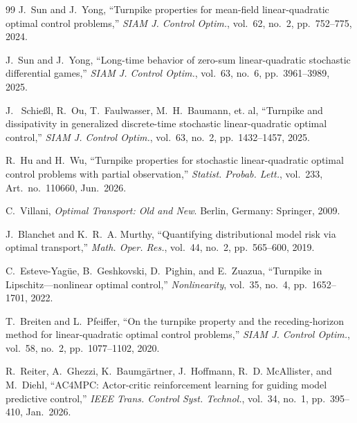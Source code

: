\documentclass[10pt,journal,twoside]{IEEEtran}
\theoremstyle{definition}
\theoremstyle{remark}
\begin{document}
\begin{thebibliography}{99}
J.~Sun and J.~Yong,
\newblock ``Turnpike properties for mean-field linear-quadratic optimal
control problems,''
\newblock \emph{SIAM J. Control Optim.}, vol.~62, no.~2,
pp.~752--775, 2024.

J.~Sun and J.~Yong,
\newblock ``Long-time behavior of zero-sum linear-quadratic stochastic
differential games,''
\newblock \emph{SIAM J. Control Optim.}, vol.~63, no.~6,
pp.~3961--3989, 2025.

J. ~Schie{\ss}l, R.~Ou, T.~Faulwasser, M.~H.~Baumann, et. al, 
\newblock ``Turnpike and dissipativity in generalized discrete-time stochastic linear-quadratic optimal control,''
\newblock \emph{SIAM J. Control Optim.}, vol.~63, no.~2, pp.~1432--1457, 2025.

R.~Hu and H.~Wu,
\newblock ``Turnpike properties for stochastic linear-quadratic optimal
control problems with partial observation,''
\newblock \emph{Statist. Probab. Lett.}, vol.~233, Art.~no.~110660,
Jun.~2026.

C.~Villani,
\newblock \emph{Optimal Transport: Old and New}.
\newblock Berlin, Germany: Springer, 2009.

J.~Blanchet and K.~R.~A. Murthy,
\newblock ``Quantifying distributional model risk via optimal
transport,''
\newblock \emph{Math. Oper. Res.}, vol.~44, no.~2, pp.~565--600, 2019.



C.~Esteve-Yag\"{u}e, B.~Geshkovski, D.~Pighin, and E.~Zuazua,
\newblock ``Turnpike in Lipschitz---nonlinear optimal control,''
\newblock \emph{Nonlinearity}, vol.~35, no.~4,
pp.~1652--1701, 2022.



T.~Breiten and L.~Pfeiffer,
\newblock ``On the turnpike property and the receding-horizon method for
linear-quadratic optimal control problems,''
\newblock \emph{SIAM J. Control Optim.}, vol.~58, no.~2,
pp.~1077--1102, 2020.

R.~Reiter, A.~Ghezzi, K.~Baumg{\"a}rtner, J.~Hoffmann,
R.~D. McAllister, and M.~Diehl,
\newblock ``AC4MPC: Actor-critic reinforcement learning for guiding model
predictive control,''
\newblock \emph{IEEE Trans. Control Syst. Technol.}, vol.~34, no.~1,
pp.~395--410, Jan.~2026.

\end{thebibliography}
\end{document}
